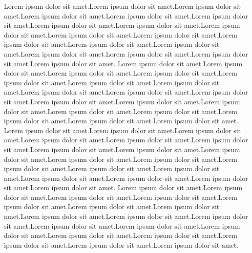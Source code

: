 \documentclass[main.tex]{subfiles}
\begin{document}
Lorem ipsum dolor sit amet.Lorem ipsum dolor sit amet.Lorem ipsum dolor sit amet.Lorem ipsum dolor sit amet.Lorem ipsum dolor sit amet.Lorem ipsum dolor sit amet.Lorem ipsum dolor sit amet.Lorem ipsum dolor sit amet.Lorem ipsum dolor sit amet.Lorem ipsum dolor sit amet.Lorem ipsum dolor sit amet.Lorem ipsum dolor sit amet.Lorem ipsum dolor sit amet.Lorem ipsum dolor sit amet.Lorem ipsum dolor sit amet.Lorem ipsum dolor sit amet.Lorem ipsum dolor sit amet.Lorem ipsum dolor sit amet.
Lorem ipsum dolor sit amet.Lorem ipsum dolor sit amet.Lorem ipsum dolor sit amet.Lorem ipsum dolor sit amet.Lorem ipsum dolor sit amet.Lorem ipsum dolor sit amet.Lorem ipsum dolor sit amet.Lorem ipsum dolor sit amet.Lorem ipsum dolor sit amet.Lorem ipsum dolor sit amet.Lorem ipsum dolor sit amet.Lorem ipsum dolor sit amet.Lorem ipsum dolor sit amet.Lorem ipsum dolor sit amet.Lorem ipsum dolor sit amet.Lorem ipsum dolor sit amet.Lorem ipsum dolor sit amet.Lorem ipsum dolor sit amet.
Lorem ipsum dolor sit amet.Lorem ipsum dolor sit amet.Lorem ipsum dolor sit amet.Lorem ipsum dolor sit amet.Lorem ipsum dolor sit amet.Lorem ipsum dolor sit amet.Lorem ipsum dolor sit amet.Lorem ipsum dolor sit amet.Lorem ipsum dolor sit amet.Lorem ipsum dolor sit amet.Lorem ipsum dolor sit amet.Lorem ipsum dolor sit amet.Lorem ipsum dolor sit amet.Lorem ipsum dolor sit amet.Lorem ipsum dolor sit amet.Lorem ipsum dolor sit amet.Lorem ipsum dolor sit amet.Lorem ipsum dolor sit amet.
Lorem ipsum dolor sit amet.Lorem ipsum dolor sit amet.Lorem ipsum dolor sit amet.Lorem ipsum dolor sit amet.Lorem ipsum dolor sit amet.Lorem ipsum dolor sit amet.Lorem ipsum dolor sit amet.Lorem ipsum dolor sit amet.Lorem ipsum dolor sit amet.Lorem ipsum dolor sit amet.Lorem ipsum dolor sit amet.Lorem ipsum dolor sit amet.Lorem ipsum dolor sit amet.Lorem ipsum dolor sit amet.Lorem ipsum dolor sit amet.Lorem ipsum dolor sit amet.Lorem ipsum dolor sit amet.Lorem ipsum dolor sit amet.
\end{document}
